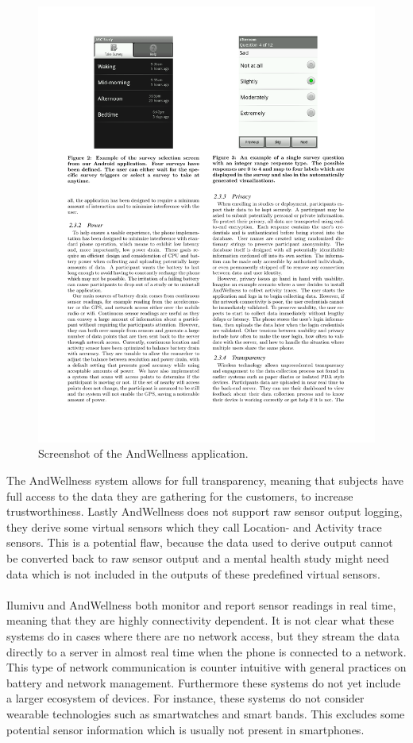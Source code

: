 \begin{figure}[!htbp]
	\centering
	\includegraphics[height=0.5\textwidth]{graphic/existing_solutions/and_wellness.pdf}
	\caption[]{Screenshot of the AndWellness application\parencite{hicks2010andwellness}.}
	\label{fig:andwellness_screenshot}
\end{figure}
\FloatBarrier

The AndWellness system allows for full transparency, meaning that subjects have full access to the data they are gathering for the customers, to increase trustworthiness. Lastly AndWellness does not support raw sensor output logging, they derive some virtual sensors which they call Location- and Activity trace sensors. This is a potential flaw, because the data used to derive output cannot be converted back to raw sensor output and a mental health study might need data which is not included in the outputs of these predefined virtual sensors.
\\\\
Ilumivu and AndWellness both monitor and report sensor readings in real time, meaning that they are highly connectivity dependent. It is not clear what these systems do in cases where there are no network access, but they stream the data directly to a server in almost real time when the phone is connected to a network. This type of network communication is counter intuitive with general practices on battery and network management. Furthermore these systems do not yet include a larger ecosystem of devices. For instance, these systems do not consider wearable technologies such as smartwatches and smart bands. This excludes some potential sensor information which is usually not present in smartphones.

